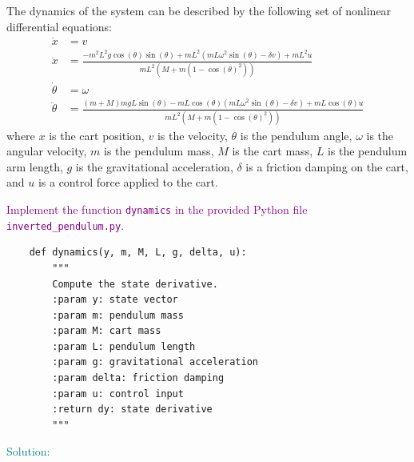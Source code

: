 \documentclass[a4 paper]{article}
\begin{document}
The dynamics of the system can be described by the following set of nonlinear differential equations:
\begin{align}
    \dot{x} &= v \label{eq:cart_position} \\
    \ddot{x} &= \frac{-m^2 L^2 g \cos(\theta) \sin(\theta) + m L^2 \left( m L \omega^2 \sin(\theta) - \delta v \right) + m L^2 u}{m L^2 \left( M + m (1 - \cos(\theta)^2) \right)} \label{eq:cart_velocity} \\
    \dot{\theta} &= \omega \label{eq:pendulum_angle} \\
    \ddot{\theta} &= \frac{(m + M) m g L \sin(\theta) - m L \cos(\theta) \left( m L \omega^2 \sin(\theta) - \delta v \right) + m L \cos(\theta) u}{m L^2 \left( M + m (1 - \cos(\theta)^2) \right)} \label{eq:pendulum_angular_velocity}
\end{align}
where \( x \) is the cart position, \( v \) is the velocity, \( \theta \) is the pendulum angle, \( \omega \) is the angular velocity, \( m \) is the pendulum mass, \( M \) is the cart mass, \( L \) is the pendulum arm length, \( g \) is the gravitational acceleration, \( \delta \) is a friction damping on the cart, and \( u \) is a control force applied to the cart.



\textcolor{purple}{
 Implement the function \texttt{dynamics} in the provided Python file \texttt{inverted\_pendulum.py}.
}

\begin{verbatim}
    def dynamics(y, m, M, L, g, delta, u):
        """
        Compute the state derivative.
        :param y: state vector
        :param m: pendulum mass
        :param M: cart mass
        :param L: pendulum length
        :param g: gravitational acceleration
        :param delta: friction damping
        :param u: control input
        :return dy: state derivative
        """
\end{verbatim}

\medbreak

\textcolor{teal}{
    Solution:
}
\end{document}
